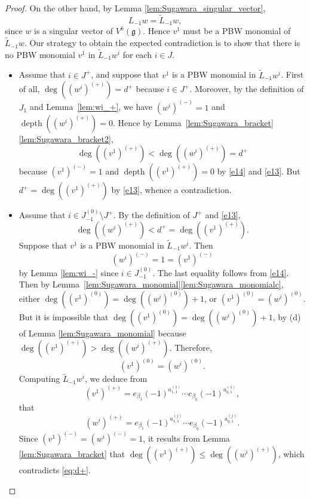 \documentclass[JEP,XML,SOM,Unicode]{cedram}
\let\be\beta
\DeclareMathOperator{\dep}{depth}
\newcommand \g{\mathfrak g}
\theoremstyle{definition}
\begin{document}
\begin{proof}
On the other hand, by Lemma \ref{lem:Sugawara_singular_vector},
\begin{equation*}
L_{-1} w={\tilde{L}_{-1} w},
\end{equation*}
since $w$ is a singular vector of $V^k(\g)$.
Hence $v^1$ must be a PBW monomial of {$\tilde{L}_{-1} w$}.
Our strategy to obtain the expected contradiction
is to show that there is no PBW monomial $v^1$ in {$\tilde{L}_{-1} w^i$}
for each $i \in J$.

\begin{itemize}
\item
Assume that $i\in J^+$, and suppose that
$v^{1}$ is a PBW monomial in ${\tilde{L}_{-1} w^{i}}$.
First of all, $\deg((w^{i})^{(+)}) = d^+$
because $i \in J^+$. Moreover,
by the definition of $J_1$ and Lemma~\ref{lem:wi_+},
we have $(w^{i})^{(-)}=1$ and $\dep((w^{i})^{(+)})=0$.
Hence by Lemma~\ref{lem:Sugawara_bracket}\eqref{lem:Sugawara_bracket2},
\[
\deg((v^1)^{(+)}) < \deg((w^{i})^{(+)}) = d^+
\]
because $(v^1)^{(-)}=1$ and $\dep((v^{1})^{(+)})=0$ by \eqref{e14}
and \eqref{e13}.
But $d^+ = \deg((v^1)^{(+)})$ by \eqref{e13},
whence a contradiction.

\item
Assume that $i \in J_{-1}^{(0)} \setminus J^+$.
By the definition of $J^+$ and \eqref{e13},
\begin{equation}
\label{eq:d+}
\deg ((w^{i})^{(+)}) < d^+ =\deg((v^1)^{(+)}).
\end{equation}
Suppose that
$v^{1}$ is a PBW monomial in ${\tilde{L}_{-1} w^{i}}$.
Then
\begin{equation}
\label{e15}
(w^{i})^{(-)}=1 = (v^1)^{(-)}
\end{equation}
by Lemma \ref{lem:wi_-} since $i \in J_{-1}^{(0)}$.
The last equality follows from \eqref{e14}.
Then by Lemma~\ref{lem:Sugawara_monomial}\eqref{lem:Sugawara_monomialc},
either $\deg((v^1)^{(0)})=\deg((w^{i})^{(0)})+1$,
or $(v^1)^{(0)}=(w^{i})^{(0)}.$
But it is impossible that $\deg((v^1)^{(0)})=\deg((w^{i})^{(0)})+1$,
by (d) of Lemma \ref{lem:Sugawara_monomial} because $\deg((v^1)^{(+)}) > \deg ((w^{i})^{(+)})$.
Therefore,
\[
(v^1)^{(0)}=(w^{i})^{(0)}.
\]
Computing $\tilde{L}_{-1} w^{i}$, we deduce from
\[
(v^1)^{(+)}=e_{\be_1}(-1)^{a^{(1)}_{1,1}}\cdots e_{\be_{q}}(-1)^{a^{(1)}_{q,1}},
\]
that
\[
(w^i)^{(+)}=e_{\be_1}(-1)^{a^{(j)}_{1,1}}\cdots e_{\be_{q}}(-1)^{a^{(j)}_{q,1}}.
\]
Since $(v^1)^{(-)}\!=\!(w^{i})^{(-)}\!=\!1$, it
results from Lemma \ref{lem:Sugawara_bracket}
that \hbox{$\deg((v^1)^{(+)})\!\leq\!\deg((w^{i})^{(+)})$},
which contradicts \eqref{eq:d+}.


\end{itemize}
\end{proof}
\end{document}
